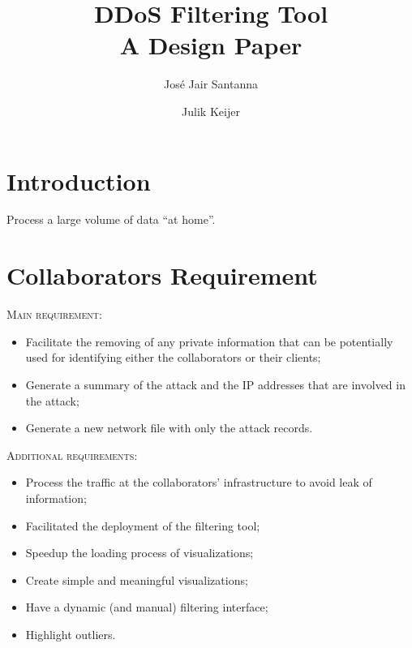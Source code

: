 \documentclass{llncs}
\begin{document}
\title{\huge DDoS Filtering Tool\\ \small A Design Paper}

\author{Jos\'e Jair Santanna \and Julik Keijer}
\maketitle             


\section{Introduction}
Process a large volume of data ``at home''.

\section{Collaborators Requirement}

\noindent
\textsc{Main requirement:} 
\begin{itemize}
	\item Facilitate the removing of any private information that can be potentially used for identifying either the collaborators or their clients;
	\item Generate a summary of the attack and the IP addresses that are involved in the attack;
	\item Generate a new network file with only the attack records.
\end{itemize}

\noindent
\textsc{Additional requirements:}
\begin{itemize}
	\item Process the traffic at the collaborators' infrastructure to avoid leak of information;
	\item Facilitated the deployment of the filtering tool; 
	\item Speedup the loading process of visualizations;
	\item Create simple and meaningful visualizations;
	\item Have a dynamic (and manual) filtering interface;
	\item Highlight outliers.
\end{itemize}
\end{document}
